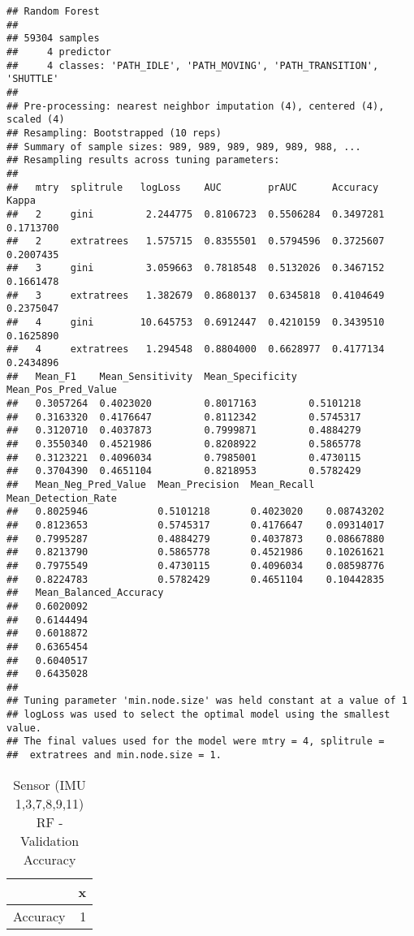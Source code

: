 \documentclass[]{article}
\begin{document}
\begin{verbatim}
## Random Forest 
## 
## 59304 samples
##     4 predictor
##     4 classes: 'PATH_IDLE', 'PATH_MOVING', 'PATH_TRANSITION', 'SHUTTLE' 
## 
## Pre-processing: nearest neighbor imputation (4), centered (4), scaled (4) 
## Resampling: Bootstrapped (10 reps) 
## Summary of sample sizes: 989, 989, 989, 989, 989, 988, ... 
## Resampling results across tuning parameters:
## 
##   mtry  splitrule   logLoss    AUC        prAUC      Accuracy   Kappa    
##   2     gini         2.244775  0.8106723  0.5506284  0.3497281  0.1713700
##   2     extratrees   1.575715  0.8355501  0.5794596  0.3725607  0.2007435
##   3     gini         3.059663  0.7818548  0.5132026  0.3467152  0.1661478
##   3     extratrees   1.382679  0.8680137  0.6345818  0.4104649  0.2375047
##   4     gini        10.645753  0.6912447  0.4210159  0.3439510  0.1625890
##   4     extratrees   1.294548  0.8804000  0.6628977  0.4177134  0.2434896
##   Mean_F1    Mean_Sensitivity  Mean_Specificity  Mean_Pos_Pred_Value
##   0.3057264  0.4023020         0.8017163         0.5101218          
##   0.3163320  0.4176647         0.8112342         0.5745317          
##   0.3120710  0.4037873         0.7999871         0.4884279          
##   0.3550340  0.4521986         0.8208922         0.5865778          
##   0.3123221  0.4096034         0.7985001         0.4730115          
##   0.3704390  0.4651104         0.8218953         0.5782429          
##   Mean_Neg_Pred_Value  Mean_Precision  Mean_Recall  Mean_Detection_Rate
##   0.8025946            0.5101218       0.4023020    0.08743202         
##   0.8123653            0.5745317       0.4176647    0.09314017         
##   0.7995287            0.4884279       0.4037873    0.08667880         
##   0.8213790            0.5865778       0.4521986    0.10261621         
##   0.7975549            0.4730115       0.4096034    0.08598776         
##   0.8224783            0.5782429       0.4651104    0.10442835         
##   Mean_Balanced_Accuracy
##   0.6020092             
##   0.6144494             
##   0.6018872             
##   0.6365454             
##   0.6040517             
##   0.6435028             
## 
## Tuning parameter 'min.node.size' was held constant at a value of 1
## logLoss was used to select the optimal model using the smallest value.
## The final values used for the model were mtry = 4, splitrule =
##  extratrees and min.node.size = 1.
\end{verbatim}

\begin{table}[!h]

\caption{\label{tab:sensor-rf-results}Sensor (IMU 1,3,7,8,9,11) RF - Validation Accuracy}
\centering
\begin{tabular}[t]{lr}
\toprule
  & x\\
\midrule
Accuracy & 1\\
\bottomrule
\end{tabular}
\end{table}
\end{document}

